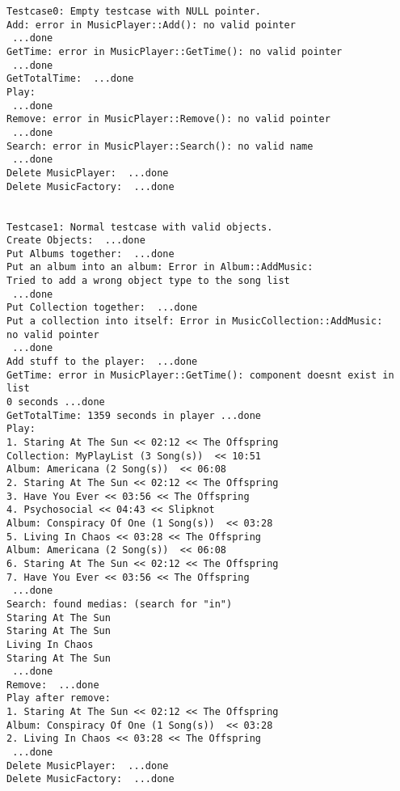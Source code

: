 \documentclass[12pt,a4paper]{article}
\begin{document}
\begin {verbatim}
Testcase0: Empty testcase with NULL pointer.
Add: error in MusicPlayer::Add(): no valid pointer
 ...done
GetTime: error in MusicPlayer::GetTime(): no valid pointer
 ...done
GetTotalTime:  ...done
Play:
 ...done
Remove: error in MusicPlayer::Remove(): no valid pointer
 ...done
Search: error in MusicPlayer::Search(): no valid name
 ...done
Delete MusicPlayer:  ...done
Delete MusicFactory:  ...done


Testcase1: Normal testcase with valid objects.
Create Objects:  ...done
Put Albums together:  ...done
Put an album into an album: Error in Album::AddMusic: 
Tried to add a wrong object type to the song list
 ...done
Put Collection together:  ...done
Put a collection into itself: Error in MusicCollection::AddMusic: 
no valid pointer
 ...done
Add stuff to the player:  ...done
GetTime: error in MusicPlayer::GetTime(): component doesnt exist in list
0 seconds ...done
GetTotalTime: 1359 seconds in player ...done
Play:
1. Staring At The Sun << 02:12 << The Offspring
Collection: MyPlayList (3 Song(s))  << 10:51
Album: Americana (2 Song(s))  << 06:08
2. Staring At The Sun << 02:12 << The Offspring
3. Have You Ever << 03:56 << The Offspring
4. Psychosocial << 04:43 << Slipknot
Album: Conspiracy Of One (1 Song(s))  << 03:28
5. Living In Chaos << 03:28 << The Offspring
Album: Americana (2 Song(s))  << 06:08
6. Staring At The Sun << 02:12 << The Offspring
7. Have You Ever << 03:56 << The Offspring
 ...done
Search: found medias: (search for "in")
Staring At The Sun
Staring At The Sun
Living In Chaos
Staring At The Sun
 ...done
Remove:  ...done
Play after remove:
1. Staring At The Sun << 02:12 << The Offspring
Album: Conspiracy Of One (1 Song(s))  << 03:28
2. Living In Chaos << 03:28 << The Offspring
 ...done
Delete MusicPlayer:  ...done
Delete MusicFactory:  ...done
\end {verbatim}
\end{document}
